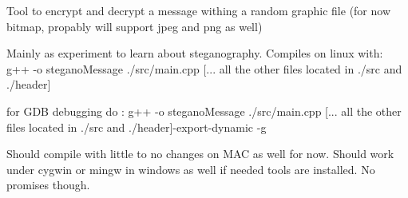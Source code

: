 Tool to encrypt and decrypt a message withing a random graphic file (for now bitmap, propably will support jpeg and png as well)

Mainly as experiment to learn about steganography. Compiles on linux with\+: g++ -\/o stegano\+Message ./src/main.cpp \mbox{[}... all the other files located in ./src and ./header\mbox{]}

for G\+DB debugging do \+: g++ -\/o stegano\+Message ./src/main.cpp \mbox{[}... all the other files located in ./src and ./header\mbox{]}-\/export-\/dynamic -\/g

Should compile with little to no changes on M\+AC as well for now. Should work under cygwin or mingw in windows as well if needed tools are installed. No promises though. 